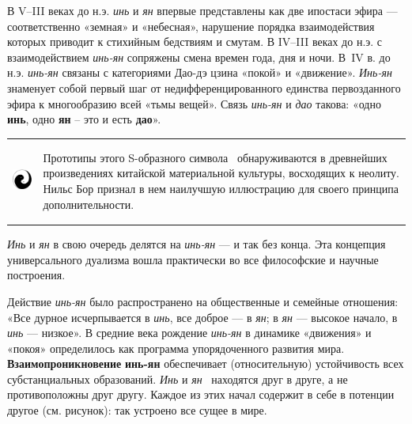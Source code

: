 \documentclass[twoside,a4paper]{article}
\begin{document}
{
В \foreignlanguage{english}{V}–\foreignlanguage{english}{III} веках до н.э. \textit{инь} и \textit{ян} впервые
представлены как две ипостаси эфира — соответственно «земная» и «небесная», нарушение порядка взаимодействия которых
приводит к стихийным бедствиям и смутам. В \foreignlanguage{english}{IV}–\foreignlanguage{english}{III} веках до н.э. с
взаимодействием \textit{инь-ян} сопряжены смена времен года, дня и ночи. В~\foreignlanguage{english}{IV} в. до н.э.
\textit{инь-ян} связаны с категориями Дао-дэ цзина «покой» и «движение». \textit{Инь-ян} знаменует собой первый шаг от
недифференцированного единства первозданного эфира к многообразию всей «тьмы вещей». Связь \textit{инь-ян} и
\textit{дао} такова: «одно \textbf{инь}, одно \textbf{ян} – это и есть \textbf{дао}». }

\begin{flushleft}
\tablefirsthead{}
\tablehead{}
\tabletail{}
\tablelasttail{}
\begin{supertabular}{m{2.87126in}m{4.01086in}}
\centering  \includegraphics[width=1.0209in,height=1.0264in]{a913-img001.png}  &
{ Прототипы этого S-образного символа \ обнаруживаются в древнейших произведениях китайской
материальной культуры, восходящих к неолиту. Нильс Бор признал в нем наилучшую иллюстрацию для своего принципа
дополнительности. }\\
\end{supertabular}
\end{flushleft}
{
\textit{Инь} и \textit{ян} в свою очередь делятся на \textit{инь-ян} — и так без конца. Эта концепция универсального
дуализма вошла практически во все философские и научные построения.}

{
Действие \textit{инь-ян} было распространено на общественные и семейные отношения: «Все дурное исчерпывается в
\textit{инь}, все доброе — в \textit{ян}; в \textit{ян} — высокое начало, в \textit{инь} — низкое». В средние века
рождение \textit{инь-ян} в динамике «движения» и «покоя» определилось как программа упорядоченного развития мира.
\textbf{Взаимопроникновение} \textbf{инь-ян} обеспечивает (относительную) устойчивость всех субстанциальных
образований. \textit{Инь} и \textit{ян} \ находятся друг в друге, а не противоположны друг другу. Каждое из этих начал
содержит в себе в потенции другое (см. рисунок): так устроено все сущее в мире.}
\end{document}
